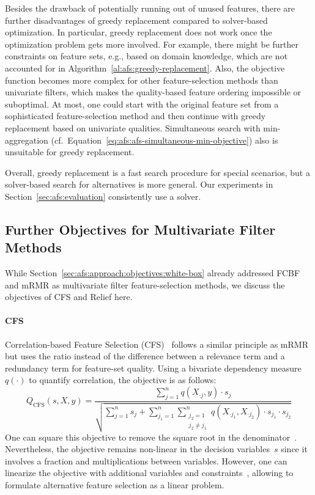 \documentclass{article}
\theoremstyle{definition}
\begin{document}
Besides the drawback of potentially running out of unused features, there are further disadvantages of greedy replacement compared to solver-based optimization.
In particular, greedy replacement does not work once the optimization problem gets more involved.
For example, there might be further constraints on feature sets, e.g., based on domain knowledge, which are not accounted for in Algorithm~\ref{al:afs:greedy-replacement}.
Also, the objective function becomes more complex for other feature-selection methods than univariate filters, which makes the quality-based feature ordering impossible or suboptimal.
At most, one could start with the original feature set from a sophisticated feature-selection method and then continue with greedy replacement based on univariate qualities.
Simultaneous search with min-aggregation (cf.~Equation~\ref{eq:afs:afs-simultaneous-min-objective}) also is unsuitable for greedy replacement.

Overall, greedy replacement is a fast search procedure for special scenarios, but a solver-based search for alternatives is more general.
Our experiments in Section~\ref{sec:afs:evaluation} consistently use a solver.

\subsection{Further Objectives for Multivariate Filter Methods}
\label{sec:afs:appendix:multivariate-filter-objectives}

While Section~\ref{sec:afs:approach:objectives:white-box} already addressed FCBF and mRMR as multivariate filter feature-selection methods, we discuss the objectives of CFS and Relief here.

\paragraph{CFS}

Correlation-based Feature Selection (CFS)~\cite{hall1999correlation, hall2000correlation} follows a similar principle as mRMR but uses the ratio instead of the difference between a relevance term and a redundancy term for feature-set quality.
Using a bivariate dependency measure $q(\cdot)$ to quantify correlation, the objective is as follows:
%
\begin{equation}
	Q_{\text{CFS}}(s,X,y) = \frac{\sum_{j=1}^{n} q(X_{\cdot{}j},y) \cdot s_j}{\sqrt{\sum_{j=1}^{n} s_j + \sum_{j_1=1}^{n} \sum_{\substack{j_2=1 \\ j_2 \neq j_1}}^{n} q(X_{\cdot{}j_1}, X_{\cdot{}j_2}) \cdot s_{j_1} \cdot s_{j_2}}}
	\label{eq:afs:cfs}
\end{equation}
%
One can square this objective to remove the square root in the denominator~\cite{nguyen2010towards}.
Nevertheless, the objective remains non-linear in the decision variables~$s$ since it involves a fraction and multiplications between variables.
However, one can linearize the objective with additional variables and constraints~\cite{nguyen2010improving, nguyen2010towards}, allowing to formulate alternative feature selection as a linear problem.
\end{document}
